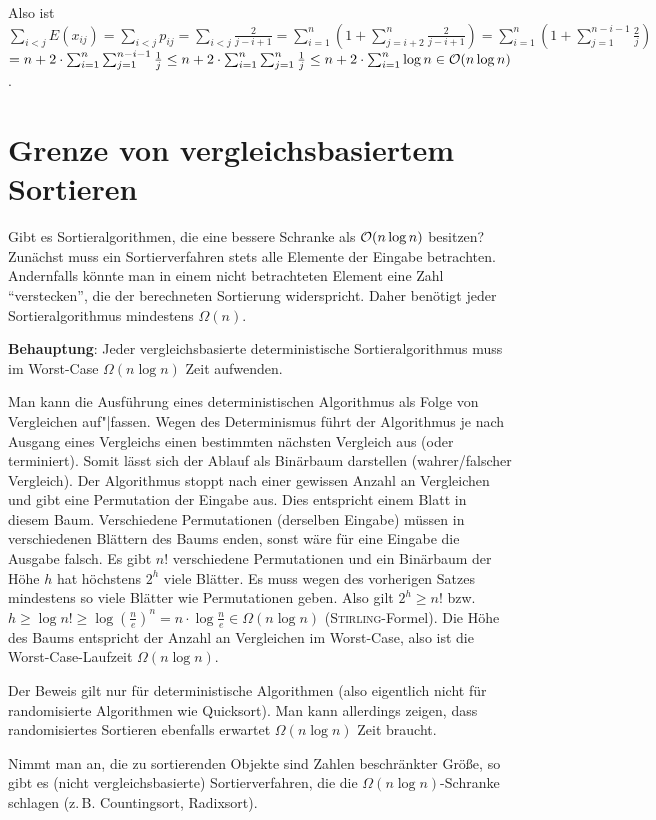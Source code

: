 \begin{Beweis}
    Also ist $\sum_{i < j} E(x_{ij}) = \sum_{i < j} p_{ij}
    = \sum_{i < j} \frac{2}{j - i + 1}
    = \sum_{i=1}^n (1 + \sum_{j=i+2}^n \frac{2}{j - i + 1})
    = \sum_{i=1}^n (1 + \sum_{j=1}^{n-i-1} \frac{2}{j})$ \\
    $= n + 2 \cdot \sum_{i=1}^n \sum_{j=1}^{n-i-1} \frac{1}{j}
    \le n + 2 \cdot \sum_{i=1}^n \sum_{j=1}^{n} \frac{1}{j}
    \le n + 2 \cdot \sum_{i=1}^n \log n \in \mathcal{O}(n \log n)$.
\end{Beweis}


\section{%
    Grenze von vergleichsbasiertem Sortieren%
}
\label{ss_grenze_von_vergleichsbasiertem_sortieren}

Gibt es Sortieralgorithmen, die eine bessere Schranke als $\mathcal{O}(n \log n)$
besitzen?
Zunächst muss ein Sortierverfahren stets alle Elemente der Eingabe betrachten.
Andernfalls könnte man in einem nicht betrachteten Element eine Zahl
"`verstecken"', die der berechneten Sortierung widerspricht.
Daher benötigt jeder Sortieralgorithmus mindestens $\Omega(n)$.

\textbf{Behauptung}: Jeder vergleichsbasierte deterministische
Sortieralgorithmus muss im Worst-Case $\Omega(n \log n)$ Zeit aufwenden.

\begin{Beweis}
    Man kann die Ausführung eines deterministischen Algorithmus als Folge
    von Vergleichen auf"|fassen.
    Wegen des Determinismus führt der Algorithmus je nach Ausgang eines
    Vergleichs einen bestimmten nächsten Vergleich aus (oder terminiert).
    Somit lässt sich der Ablauf als Binärbaum darstellen (wahrer/falscher
    Vergleich).
    Der Algorithmus stoppt nach einer gewissen Anzahl an Vergleichen und gibt
    eine Permutation der Eingabe aus.
    Dies entspricht einem Blatt in diesem Baum.
    Verschiedene Permutationen (derselben Eingabe) müssen in verschiedenen
    Blättern des Baums enden, sonst wäre für eine Eingabe die Ausgabe falsch.
    Es gibt $n!$ verschiedene Permutationen und ein Binärbaum der Höhe $h$ hat
    höchstens $2^h$ viele Blätter.
    Es muss wegen des vorherigen Satzes mindestens so viele Blätter wie
    Permutationen geben.
    Also gilt $2^h \ge n!$ bzw.
    $h \ge \log n! \ge \log \left(\frac{n}{e}\right)^n
    = n \cdot \log \frac{n}{e} \in \Omega(n \log n)$
    (\textsc{Stirling}-Formel).
    Die Höhe des Baums entspricht der Anzahl an Vergleichen im Worst-Case, also
    ist die Worst-Case-Laufzeit $\Omega(n \log n)$.
\end{Beweis}

Der Beweis gilt nur für deterministische Algorithmen (also eigentlich nicht
für randomisierte Algorithmen wie Quicksort).
Man kann allerdings zeigen, dass randomisiertes Sortieren ebenfalls
erwartet $\Omega(n \log n)$ Zeit braucht.

Nimmt man an, die zu sortierenden Objekte sind Zahlen beschränkter Größe,
so gibt es (nicht vergleichsbasierte) Sortierverfahren, die die
$\Omega(n \log n)$-Schranke schlagen (z.\,B. Countingsort, Radixsort).

\pagebreak
